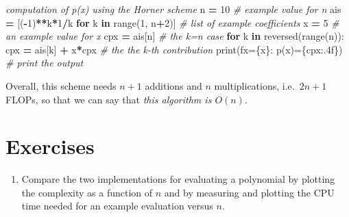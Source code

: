 \documentclass[
]{book}
\newenvironment{Shaded}{\begin{snugshade}}{\end{snugshade}}
\newcommand{\BuiltInTok}[1]{#1}
\newcommand{\CommentTok}[1]{\textcolor[rgb]{0.56,0.35,0.01}{\textit{#1}}}
\newcommand{\ControlFlowTok}[1]{\textcolor[rgb]{0.13,0.29,0.53}{\textbf{#1}}}
\newcommand{\DecValTok}[1]{\textcolor[rgb]{0.00,0.00,0.81}{#1}}
\newcommand{\KeywordTok}[1]{\textcolor[rgb]{0.13,0.29,0.53}{\textbf{#1}}}
\newcommand{\NormalTok}[1]{#1}
\newcommand{\OperatorTok}[1]{\textcolor[rgb]{0.81,0.36,0.00}{\textbf{#1}}}
\newcommand{\SpecialCharTok}[1]{\textcolor[rgb]{0.00,0.00,0.00}{#1}}
\newcommand{\SpecialStringTok}[1]{\textcolor[rgb]{0.31,0.60,0.02}{#1}}
\providecommand{\tightlist}{%
  \setlength{\itemsep}{0pt}\setlength{\parskip}{0pt}}
\theoremstyle{definition}
\theoremstyle{definition}
\theoremstyle{definition}
\theoremstyle{definition}
\theoremstyle{remark}
\begin{document}
\begin{Shaded}
\begin{Highlighting}[]
\CommentTok{\textquotesingle{}\textquotesingle{}\textquotesingle{}computation of p(x) using the Horner scheme}
\CommentTok{\textquotesingle{}\textquotesingle{}\textquotesingle{}}
\NormalTok{n }\OperatorTok{=} \DecValTok{10}                                      \CommentTok{\# example value for n}
\NormalTok{ais }\OperatorTok{=}\NormalTok{ [(}\OperatorTok{{-}}\DecValTok{1}\NormalTok{)}\OperatorTok{**}\NormalTok{k}\OperatorTok{*}\DecValTok{1}\OperatorTok{/}\NormalTok{k }\ControlFlowTok{for}\NormalTok{ k }\KeywordTok{in} \BuiltInTok{range}\NormalTok{(}\DecValTok{1}\NormalTok{, n}\OperatorTok{+}\DecValTok{2}\NormalTok{)]  }\CommentTok{\# list of example coefficients}
\NormalTok{x }\OperatorTok{=} \DecValTok{5}                                       \CommentTok{\# an example value for x}
\NormalTok{cpx }\OperatorTok{=}\NormalTok{ ais[n]                                }\CommentTok{\# the k=n case}
\ControlFlowTok{for}\NormalTok{ k }\KeywordTok{in} \BuiltInTok{reversed}\NormalTok{(}\BuiltInTok{range}\NormalTok{(n)):                }
\NormalTok{    cpx }\OperatorTok{=}\NormalTok{ ais[k] }\OperatorTok{+}\NormalTok{ x}\OperatorTok{*}\NormalTok{cpx                    }\CommentTok{\# the the k{-}th contribution}
\BuiltInTok{print}\NormalTok{(}\SpecialStringTok{f\textquotesingle{}x=}\SpecialCharTok{\{x\}}\SpecialStringTok{: p(x)=}\SpecialCharTok{\{}\NormalTok{cpx}\SpecialCharTok{:.4f\}}\SpecialStringTok{\textquotesingle{}}\NormalTok{)             }\CommentTok{\# print the output }
\end{Highlighting}
\end{Shaded}

Overall, this scheme needs \(n+1\) additions and \(n\) multiplications, i.e.~\(2n+1\) FLOPs, so that we can say that \emph{this algorithm is \(O(n)\)}.

\hypertarget{exercises}{%
\section{Exercises}\label{exercises}}

\begin{enumerate}
\def\labelenumi{\arabic{enumi}.}
\tightlist
\item
  Compare the two implementations for evaluating a polynomial by plotting the complexity as a function of \(n\) and by measuring and plotting the CPU time needed for an example evaluation versus \(n\).
\end{enumerate}
\end{document}
